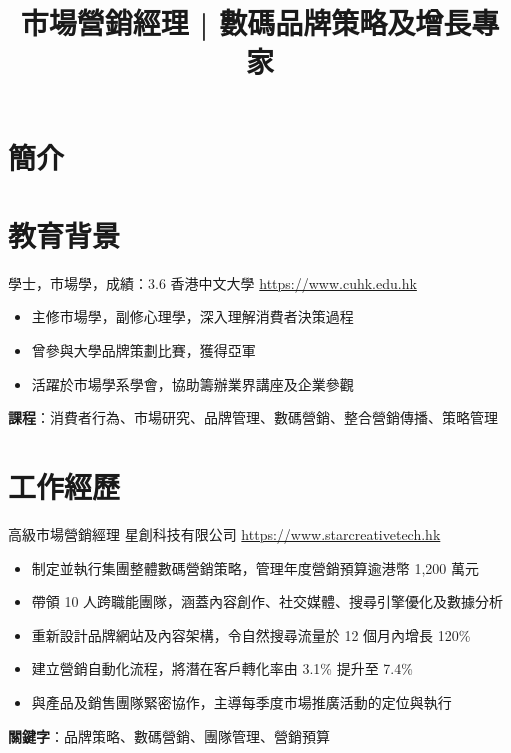 \documentclass[a4paper, serif, 10pt]{moderncv}
\title{市場營銷經理 | 數碼品牌策略及增長專家}
\begin{document}
\maketitle

\section{簡介}

\section{教育背景}

        {學士，市場學，成績：3.6}
        {香港中文大學}
        {\url{https://www.cuhk.edu.hk}}
        {}
        {\begin{itemize}
\item 主修市場學，副修心理學，深入理解消費者決策過程
\item 曾參與大學品牌策劃比賽，獲得亞軍
\item 活躍於市場學系學會，協助籌辦業界講座及企業參觀
\end{itemize}
\textbf{課程}：消費者行為、市場研究、品牌管理、數碼營銷、整合營銷傳播、策略管理}
\section{工作經歷}

        {高級市場營銷經理}
        {星創科技有限公司}
        {\url{https://www.starcreativetech.hk}}
        {}
        {\begin{itemize}
\item 制定並執行集團整體數碼營銷策略，管理年度營銷預算逾港幣 1,200 萬元
\item 帶領 10 人跨職能團隊，涵蓋內容創作、社交媒體、搜尋引擎優化及數據分析
\item 重新設計品牌網站及內容架構，令自然搜尋流量於 12 個月內增長 120\%
\item 建立營銷自動化流程，將潛在客戶轉化率由 3.1\% 提升至 7.4\%
\item 與產品及銷售團隊緊密協作，主導每季度市場推廣活動的定位與執行
\end{itemize}
\textbf{關鍵字}：品牌策略、數碼營銷、團隊管理、營銷預算}
\end{document}
